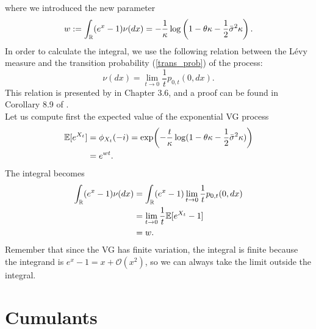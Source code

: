 where we introduced the new parameter
\begin{equation}\label{parameter_w}
 w := \int_{\mathbb{R}} (e^x-1) \nu(dx) = - \frac{1}{\kappa} \log \left( 1-\theta \kappa -\frac{1}{2}\bar\sigma^2 \kappa \right).
\end{equation}
In order to calculate the integral, we use the following relation between the Lévy measure and the transition probability (\ref{trans_prob}) of the process:
\begin{equation}
 \nu(dx) = \lim_{t\to 0} \frac{1}{t} p_{0,t}(0,dx).
\end{equation}
This relation is presented by \cite{Cont} in Chapter 3.6, and a proof can be found in Corollary 8.9 of \cite{Sato}. \\
Let us compute first the expected value of the exponential VG process
\begin{align*}
\mathbb{E}[ e^{X_t}] &= \phi_{X_t}(-i) = \exp \biggl( -\frac{t}{\kappa} \log(1-\theta \kappa -\frac{1}{2}\bar\sigma^2 \kappa ) \biggr)\\
 &= e^{w t}.
\end{align*}
The integral becomes
\begin{align*}
 \int_{\mathbb{R}} (e^x-1) \nu(dx) &= \int_{\mathbb{R}} (e^x-1) \lim_{t\to 0} \frac{1}{t} p_{0,t}(0,dx) \\ 
         &= \lim_{t\to 0} \frac{1}{t} \mathbb{E}[ e^{X_t} - 1 ] \\
         &= w.
\end{align*}
Remember that since the VG has finite variation, the integral is finite because the integrand is $e^x-1 = x + \mathcal{O}(x^2)$,
so we can always take the limit outside the integral.





\section{Cumulants}\label{cumulant_sec}

